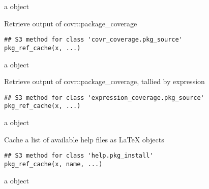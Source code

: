 \documentclass[a4paper]{book}
\begin{document}
%
\begin{Value}
a  object
\end{Value}
%
\begin{Description}
Retrieve output of covr::package\_coverage
\end{Description}
%
\begin{Usage}
\begin{verbatim}
## S3 method for class 'covr_coverage.pkg_source'
pkg_ref_cache(x, ...)
\end{verbatim}
\end{Usage}
%
\begin{Value}
a  object
\end{Value}
%
\begin{Description}
Retrieve output of covr::package\_coverage, tallied by expression
\end{Description}
%
\begin{Usage}
\begin{verbatim}
## S3 method for class 'expression_coverage.pkg_source'
pkg_ref_cache(x, ...)
\end{verbatim}
\end{Usage}
%
\begin{Value}
a  object
\end{Value}
%
\begin{Description}
Cache a list of available help files as LaTeX objects
\end{Description}
%
\begin{Usage}
\begin{verbatim}
## S3 method for class 'help.pkg_install'
pkg_ref_cache(x, name, ...)
\end{verbatim}
\end{Usage}
%
\begin{Value}
a  object
\end{Value}
\end{document}
